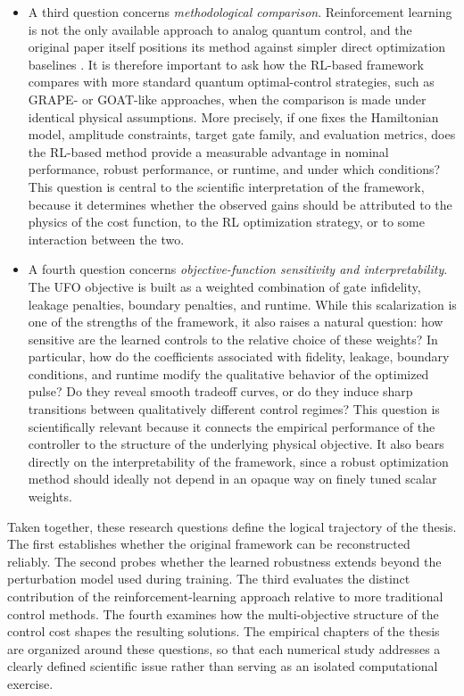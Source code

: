 \begin{itemize}
    \item A third question concerns \emph{methodological comparison}. Reinforcement learning is not the only available approach to analog quantum control, and the original paper itself positions its method against simpler direct optimization baselines \cite{Niu2019}. It is therefore important to ask how the RL-based framework compares with more standard quantum optimal-control strategies, such as GRAPE- or GOAT-like approaches, when the comparison is made under identical physical assumptions. More precisely, if one fixes the Hamiltonian model, amplitude constraints, target gate family, and evaluation metrics, does the RL-based method provide a measurable advantage in nominal performance, robust performance, or runtime, and under which conditions? This question is central to the scientific interpretation of the framework, because it determines whether the observed gains should be attributed to the physics of the cost function, to the RL optimization strategy, or to some interaction between the two.

    \item A fourth question concerns \emph{objective-function sensitivity and interpretability}. The UFO objective is built as a weighted combination of gate infidelity, leakage penalties, boundary penalties, and runtime. While this scalarization is one of the strengths of the framework, it also raises a natural question: how sensitive are the learned controls to the relative choice of these weights? In particular, how do the coefficients associated with fidelity, leakage, boundary conditions, and runtime modify the qualitative behavior of the optimized pulse? Do they reveal smooth tradeoff curves, or do they induce sharp transitions between qualitatively different control regimes? This question is scientifically relevant because it connects the empirical performance of the controller to the structure of the underlying physical objective. It also bears directly on the interpretability of the framework, since a robust optimization method should ideally not depend in an opaque way on finely tuned scalar weights.
\end{itemize}

Taken together, these research questions define the logical trajectory of the thesis. The first establishes whether the original framework can be reconstructed reliably. The second probes whether the learned robustness extends beyond the perturbation model used during training. The third evaluates the distinct contribution of the reinforcement-learning approach relative to more traditional control methods. The fourth examines how the multi-objective structure of the control cost shapes the resulting solutions. The empirical chapters of the thesis are organized around these questions, so that each numerical study addresses a clearly defined scientific issue rather than serving as an isolated computational exercise.

